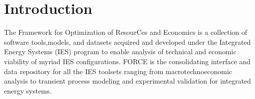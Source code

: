 \section{Introduction}
The Framework for Optimization of ResourCes and Economics is a collection of software tools,models, and datasets acquired and developed under the Integrated Energy Systems (IES) program to enable analysis of technical and economic viability of myriad IES configurations. FORCE is the consolidating interface and data repository for all the IES toolsets ranging from macrotechnoeconomic analysis to transient process modeling and experimental validation for integrated energy systems.
